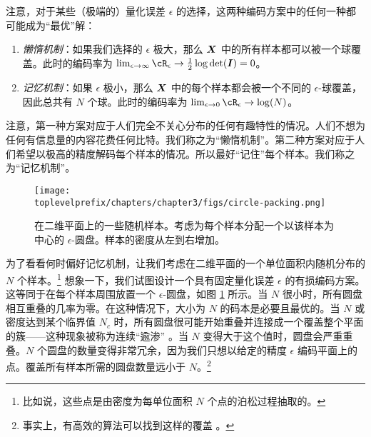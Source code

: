 \documentclass[../../book-main_zh.tex]{subfiles}
\begin{document}
注意，对于某些（极端的）量化误差 $\epsilon$ 的选择，这两种编码方案中的任何一种都可能成为“最优”解：
\begin{enumerate}
	\item {\em 懒惰机制}：如果我们选择的 $\epsilon$ 极大，那么 $\bm{X}$ 中的所有样本都可以被一个球覆盖。此时的编码率为 $\lim_{\epsilon \rightarrow \infty} \cR_\epsilon \rightarrow \frac{1}{2}\log\det (\boldsymbol{I}) = 0$。
	\item {\em 记忆机制}：如果 $\epsilon$ 极小，那么 $\bm{X}$ 中的每个样本都会被一个不同的 $\epsilon$-球覆盖，因此总共有 $N$ 个球。此时的编码率为 $\lim_{\epsilon \rightarrow 0} \cR_\epsilon \rightarrow \log(N)$。
\end{enumerate}
注意，第一种方案对应于人们完全不关心分布的任何有趣特性的情况。人们不想为任何有信息量的内容花费任何比特。我们称之为“懒惰机制”。第二种方案对应于人们希望以极高的精度解码每个样本的情况。所以最好“记住”每个样本。我们称之为“记忆机制”。
\begin{figure}
	\centering
	\texttt{[image: \\toplevelprefix/chapters/chapter3/figs/circle-packing.png]}
	\caption{在二维平面上的一些随机样本。考虑为每个样本分配一个以该样本为中心的 $\epsilon$-圆盘。样本的密度从左到右增加。}
	\label{fig:circle-packing}
\end{figure}
\begin{example}
	为了看看何时偏好记忆机制，让我们考虑在二维平面的一个单位面积内随机分布的 $N$ 个样本。\footnote{比如说，这些点是由密度为每单位面积 $N$ 个点的泊松过程抽取的。} 想象一下，我们试图设计一个具有固定量化误差 $\epsilon$ 的有损编码方案。这等同于在每个样本周围放置一个 $\epsilon$-圆盘，如图 \ref{fig:circle-packing} 所示。当 $N$ 很小时，所有圆盘相互重叠的几率为零。在这种情况下，大小为 $N$ 的码本是必要且最优的。当 $N$ 或密度达到某个临界值 $N_c$ 时，所有圆盘很可能开始重叠并连接成一个覆盖整个平面的簇——这种现象被称为连续“逾渗” \cite{Gilbert-1961,Mertens-Moore-2012}。当 $N$ 变得大于这个值时，圆盘会严重重叠。$N$ 个圆盘的数量变得非常冗余，因为我们只想以给定的精度 $\epsilon$ 编码平面上的点。覆盖所有样本所需的圆盘数量远小于 $N$。\footnote{事实上，有高效的算法可以找到这样的覆盖 \cite{Booth-2001}。}
\end{example}
\end{document}
